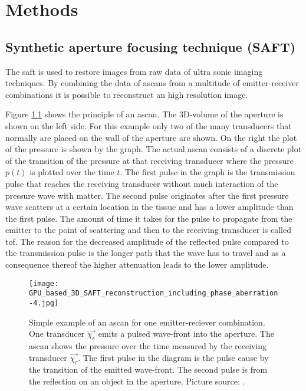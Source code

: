 \chapter{Methods}
\label{chap:methods}


\section{Synthetic aperture focusing technique (SAFT)}
\label{sec:SAFT}
The \ac{saft} is used to restore images from raw data of ultra sonic imaging techniques.
By combining the data of \acp{ascan} from a multitude of emitter-receiver combinations it is possible to reconstruct an high resolution image.

Figure \ref{ascan_example} shows the principle of an \ac{ascan}. The 3D-volume of the aperture is shown on the left side. For this example only two of the many transducers that normally are placed on the wall of the aperture are shown. On the right the plot of the pressure is shown by the graph. The actual \ac{ascan} consists of a discrete plot of the transition of the pressure at that receiving transducer where the pressure $p(t)$ is plotted over the time $t$. The first pulse in the graph is the transmission pulse that reaches the receiving transducer without much interaction of the pressure wave with matter. The second pulse originates after the first pressure wave scatters at a certain location in the tissue and has a lower amplitude than the first pulse. The amount of time it takes for the pulse to propagate from the emitter to the point of scattering and then to the receiving transducer is called \ac{tof}. The reason for the decreased amplitude of the reflected pulse compared to the transmission pulse is the longer path that the wave has to travel and as a consequence thereof the higher attenuation leads to the lower amplitude. 


\begin{figure}[H]
    \centering
    \texttt{[image: GPU\_based\_3D\_SAFT\_reconstruction\_including\_phase\_aberration-4.jpg]}
    \caption{ Simple example of an \ac{ascan} for one emitter-reciever combination. One transducer $\overrightarrow{\chi_e}$ emits a pulsed wave-front into the aperture. The \ac{ascan} shows the pressure over the time measured by the receiving transducer $\overrightarrow{\chi_r}$. The first pulse in the diagram is the pulse cause by the transition of the emitted wave-front. The second pulse is from the reflection on an object in the aperture. Picture source: \cite{Kretzek2014GPUAberration}. }
    \label{ascan_example}
\end{figure}

